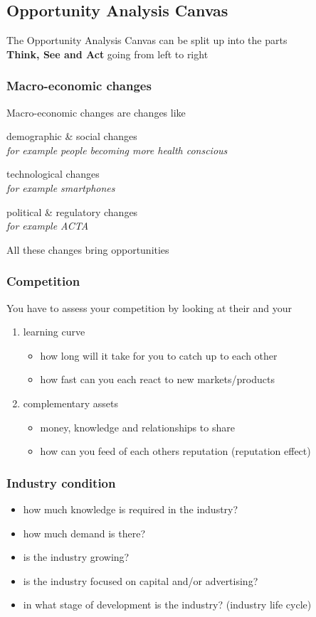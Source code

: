 \documentclass[a4paper]{article}
\begin{document}
		\subsection{Opportunity Analysis Canvas}
			The Opportunity Analysis Canvas can be split up into the parts\\
			{\bf Think, See and Act} going from left to right\\
		\subsubsection{Macro-economic changes}
			Macro-economic changes are changes like
			\begin{itemize}
			\setlength{\itemsep}{-3pt}
			{\item demographic \& social changes\\ \it{for example people becoming more health
			conscious}}
			{\item technological changes\\ {\it for example smartphones}}
			{\item political \& regulatory changes\\ \it{for example ACTA}}
			\end{itemize}
			All these changes bring opportunities
		\subsubsection{Competition}
			You have to assess your competition by looking at their and your
			\begin{enumerate}
			\setlength{\itemsep}{-3pt}
			\item learning curve
				\begin{itemize}
				\setlength{\itemsep}{-3pt}
				\item how long will it take for you to catch up to each other
				\item how fast can you each react to new markets/products
				\end{itemize}
			\item complementary assets
				\begin{itemize}
				\setlength{\itemsep}{-3pt}
				\item money, knowledge and relationships to share
				\item how can you feed of each others reputation (reputation effect)
				\end{itemize}
			\end{enumerate}
		\subsubsection{Industry condition}
			\begin{itemize}
			\setlength{\itemsep}{-3pt}
			\item how much knowledge is required in the industry?
			\item how much demand is there?
			\item is the industry growing?
			\item is the industry focused on capital and/or advertising?
			\item in what stage of development is the industry? (industry life cycle)
			\end{itemize}
\end{document}
